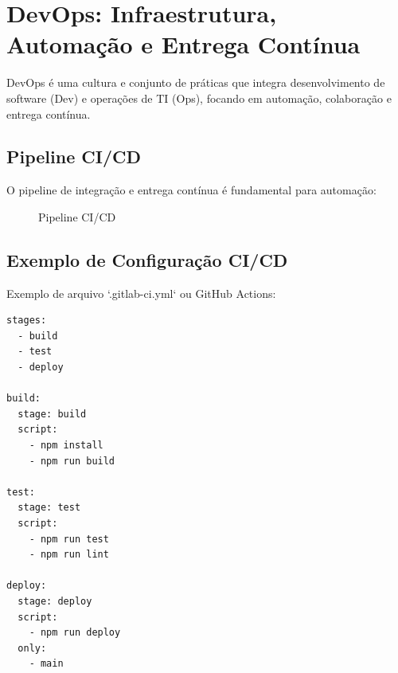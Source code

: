 \documentclass[11pt,a4paper]{article}
\begin{document}
\section{DevOps: Infraestrutura, Automação e Entrega Contínua}

DevOps \cite{wang2023} é uma cultura e conjunto de práticas que integra desenvolvimento de software (Dev) e operações de TI (Ops), focando em automação, colaboração e entrega contínua.

\subsection{Pipeline CI/CD}

O pipeline de integração e entrega contínua é fundamental para automação:

\begin{figure}[H]
\centering
{}
\caption{Pipeline CI/CD}
\label{fig:cicd}
\end{figure}

\subsection{Exemplo de Configuração CI/CD}

Exemplo de arquivo `.gitlab-ci.yml` ou GitHub Actions:

\begin{verbatim}
stages:
  - build
  - test
  - deploy

build:
  stage: build
  script:
    - npm install
    - npm run build

test:
  stage: test
  script:
    - npm run test
    - npm run lint

deploy:
  stage: deploy
  script:
    - npm run deploy
  only:
    - main
\end{verbatim}
\end{document}
